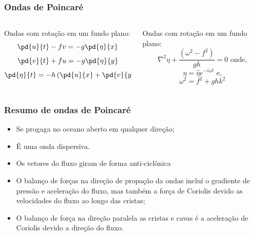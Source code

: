 \begin{frame}
\frametitle{Ondas de Poincaré}
  \begin{columns}
    \begin{column}{0.5\textwidth}
    \begin{block}{}
      Ondas com rotação em um fundo plano:
      \[
        \pd{u}{t} - fv = -g\pd{\eta}{x}
      \]
      \[
        \pd{v}{t} + fu= -g\pd{\eta}{y}
      \]
      \[
        \pd{\eta}{t} = -h\left(\pd{u}{x} + \pd{v}{y}\right)
      \]
    \end{block}
    \end{column}
    \begin{column}{0.5\textwidth}
    \begin{block}{}
      Ondas com rotação em um fundo plano:
      \[
        \nabla^2\eta + \frac{(\omega^2 - f^2)}{gh} = 0\text{ onde,}
      \]
      \[
        \eta = \hat{\eta}e^{-i\omega t} \text{ e,}
      \]
      \[
        \omega^2 = f^2 + {gh}k^2
       \]
    \end{block}
    \end{column}
  \end{columns}
\end{frame}


\begin{frame}
  \frametitle{Resumo de ondas de Poincaré}
\small{
  \begin{itemize}[<+-| alert@+>]
    \item Se progaga no oceano aberto em qualquer direção;
    \item É uma onda dispersiva.
    \item Os vetores do fluxo giram de forma anti-ciclônica
    \item O balanço de forças na direção de propação da ondas incluí o
          gradiente de pressão e aceleração do fluxo, mas também a força de
          Coriolis devido as velocidades do fluxo ao longo das cristas;
    \item O balanço de força na direção paralela as cristas e cavas é a
          aceleração de Coriolis devido a direção do fluxo.
  \end{itemize}
}
\end{frame}

